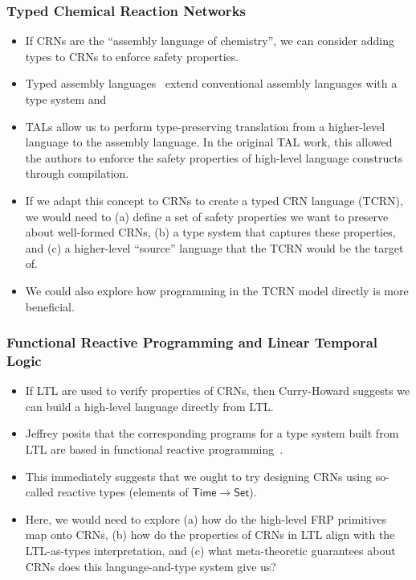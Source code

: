 \subsubsection{Typed Chemical Reaction Networks}

\begin{itemize}
  \item If CRNs are the ``assembly language of chemistry'', we can consider adding types to CRNs to enforce safety properties.
  \item Typed assembly languages~\cite{morrisett1998} extend conventional assembly languages with a type system and
  \item TALs allow us to perform type-preserving translation from a higher-level language to the assembly language.
    In the original TAL work, this allowed the authors to enforce the safety properties of high-level language constructs through compilation.
  \item If we adapt this concept to CRNs to create a typed CRN language (TCRN), we would need to (a) define a set of safety properties we want to preserve about well-formed CRNs, (b) a type system that captures these properties, and (c) a higher-level ``source'' language that the TCRN would be the target of.
  \item We could also explore how programming in the TCRN model directly is more beneficial.
\end{itemize}

\subsubsection{Functional Reactive Programming and Linear Temporal Logic}

\begin{itemize}
  \item If LTL are used to verify properties of CRNs, then Curry-Howard suggests we can build a high-level language directly from LTL.
  \item Jeffrey posits that the corresponding programs for a type system built from LTL are based in functional reactive programming~\cite{jeffrey2012}.
  \item This immediately suggests that we ought to try designing CRNs using so-called reactive types (elements of \( \mathsf{Time} \rightarrow \mathsf{Set} \)).
  \item Here, we would need to explore (a) how do the high-level FRP primitives map onto CRNs, (b) how do the properties of CRNs in LTL align with the LTL-as-types interpretation, and (c) what meta-theoretic guarantees about CRNs does this language-and-type system give us?
\end{itemize}

